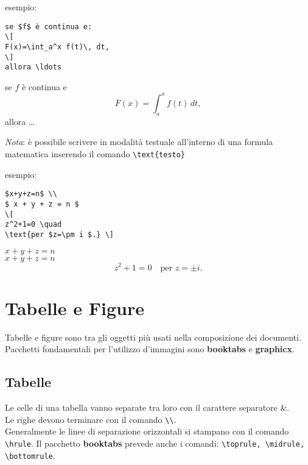 \documentclass{report}
\begin{document}
                    esempio:
\begin{multicols}{2}
\begin{lstlisting}[frame=single]
se $f$ è continua e: 
\[
F(x)=\int_a^x f(t)\, dt,
\]
allora \ldots 
\end{lstlisting}
%
\columnbreak{}
%
se $f$ è continua e 
\[
F(x)=\int_a^x f(t)\, dt,
\]
allora \ldots 
\end{multicols}
                \emph{Nota}:   è possibile scrivere in modalità testuale all'interno di una formula matematica inserendo
                        il comando \verb!\text{testo}!

                esempio:
\begin{multicols}{2}
\begin{lstlisting}[frame=single]
$x+y+z=n$ \\
$ x + y + z = n $
\[
z^2+1=0 \quad
\text{per $z=\pm i $.} \]
\end{lstlisting}
%
\columnbreak{}
%
$x+y+z=n$ \\
$ x + y + z = n $
\[
z^2+1=0 \quad
\text{per $z=\pm i $.} \]
\end{multicols}

            \section{Tabelle e Figure}
                Tabelle e figure sono tra gli oggetti più usati nella composizione dei documenti.
                Pacchetti fondamentali per l'utilizzo d'immagini sono \textbf{booktabs} e \textbf{graphicx}.
                \subsection{Tabelle}
                    Le celle di una tabella vanno separate tra loro con il carattere separatore \&. \\
                    Le righe devono terminare con il comando \verb!\\!. \\
                    Generalmente le linee di separazione orizzontali si stampano con il comando \verb!\hrule!.
                    Il pacchetto \textbf{booktabs} prevede anche i comandi: \verb!\toprule, \midrule, \bottomrule!. 
                    
\end{document}
